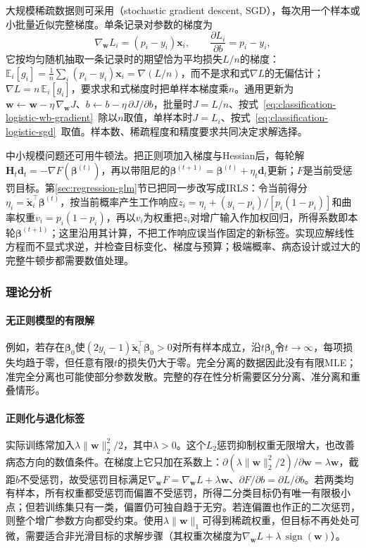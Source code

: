 大规模稀疏数据则可采用（stochastic gradient descent, SGD），每次用一个样本或小批量近似完整梯度。单条记录对参数的梯度为
\begin{equation}
  \label{eq:classification-logistic-sgd}
  \nabla_{\bm{w}}L_i=(p_i-y_i)\bm{x}_i,
  \qquad
  \frac{\partial L_i}{\partial b}=p_i-y_i,
\end{equation}
它按均匀随机抽取一条记录时的期望恰为平均损失$L/n$的梯度：$\mathbb E_i[g_i]=\tfrac1n\sum_i(p_i-y_i)\bm x_i=\nabla(L/n)$，而不是求和式$\nabla L$的无偏估计；$\nabla L=n\,\mathbb E_i[g_i]$，要求求和式梯度时把单样本梯度乘$n$。通用更新为$\bm{w}\leftarrow\bm{w}-\eta\,\nabla_{\bm{w}}J$、$b\leftarrow b-\eta\,\partial J/\partial b$，批量时$J=L/n$、按式~\eqref{eq:classification-logistic-wb-gradient}~除以$n$取值，单样本时$J=L_i$、按式~\eqref{eq:classification-logistic-sgd}~取值。样本数、稀疏程度和精度要求共同决定求解选择。

中小规模问题还可用牛顿法。把正则项加入梯度与Hessian后，每轮解$\bm H_t\bm d_t=-\nabla F(\bm\beta^{(t)})$，再以带阻尼的$\bm\beta^{(t+1)}=\bm\beta^{(t)}+\eta_t\bm d_t$更新；$F$是当前受惩罚目标。第\ref{sec:regression-glm}节已把同一步改写成IRLS：令当前得分$\eta_i=\tilde{\bm{x}}_i^{\top}\bm\beta^{(t)}$，按当前概率产生工作响应$z_i=\eta_i+(y_i-p_i)/[p_i(1-p_i)]$和曲率权重$v_i=p_i(1-p_i)$，再以$v_i$为权重把$z_i$对增广输入作加权回归，所得系数即本轮$\bm\beta^{(t+1)}$；这里沿用其计算，不把工作响应误当作固定的新标签。实现应解线性方程而不显式求逆，并检查目标变化、梯度与预算；极端概率、病态设计或过大的完整牛顿步都需要数值处理。

\subsubsection{理论分析}
\label{sec:classification-logistic-theory}

\paragraph{无正则模型的有限解}
例如，若存在$\bm{\beta}_0$使$(2y_i-1)\tilde{\bm{x}}_i^{\top}\bm{\beta}_0>0$对所有样本成立，沿$t\bm{\beta}_0$令$t\to\infty$，每项损失均趋于零，但任意有限$t$的损失仍大于零。完全分离的数据因此没有有限MLE；准完全分离也可能使部分参数发散。完整的存在性分析需要区分分离、准分离和重叠情形。

\paragraph{正则化与退化标签}
实际训练常加入$\lambda\lVert\bm{w}\rVert_2^2/2$，其中$\lambda>0$。这个$L_2$惩罚抑制权重无限增大，也改善病态方向的数值条件。在梯度上它只加在系数上：$\partial(\lambda\lVert\bm{w}\rVert_2^2/2)/\partial\bm{w}=\lambda\bm{w}$，截距$b$不受惩罚，故受惩罚目标满足$\nabla_{\bm{w}}F=\nabla_{\bm{w}}L+\lambda\bm{w}$、$\partial F/\partial b=\partial L/\partial b$。若两类均有样本，所有权重都受惩罚而偏置不受惩罚，所得二分类目标仍有唯一有限极小点；但若训练集只有一类，偏置仍可独自趋于无穷。若连偏置也作正的二次惩罚，则整个增广参数方向都受约束。使用$\lambda\lVert\bm{w}\rVert_1$可得到稀疏权重，但目标不再处处可微，需要适合非光滑目标的求解步骤（其权重次梯度为$\nabla_{\bm{w}}L+\lambda\,\operatorname{sign}(\bm{w})$）。

